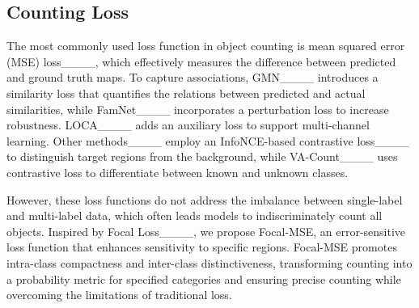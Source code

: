 \subsection{Counting Loss}
The most commonly used loss function in object counting is mean squared error (MSE) loss____, which effectively measures the difference between predicted and ground truth maps. To capture associations, GMN____ introduces a similarity loss that quantifies the relations between predicted and actual similarities, while FamNet____ incorporates a perturbation loss to increase robustness. LOCA____ adds an auxiliary loss to support multi-channel learning. Other methods____ employ an InfoNCE-based contrastive loss____ to distinguish target regions from the background, while VA-Count____ uses contrastive loss to differentiate between known and unknown classes.

However, these loss functions do not address the imbalance between single-label and multi-label data, which often leads models to indiscriminately count all objects. Inspired by Focal Loss____, we propose Focal-MSE, an error-sensitive loss function that enhances sensitivity to specific regions. Focal-MSE promotes intra-class compactness and inter-class distinctiveness, transforming counting into a probability metric for specified categories and ensuring precise counting while overcoming the limitations of traditional loss.



